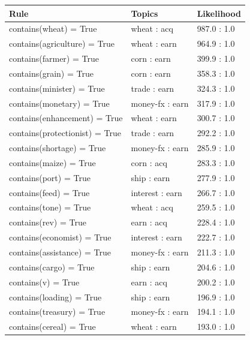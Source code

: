 \documentclass{article}
\begin{document}
\begin{table}
\begin{tabular}{l|l|l}
\textbf{Rule} & \textbf{Topics} & \textbf{Likelihood}\\ \hline
	contains(wheat) = True &            wheat : acq &   987.0 : 1.0\\
   contains(agriculture) = True &            wheat : earn   & 964.9 : 1.0\\
        contains(farmer) = True   &           corn : earn   &    399.9 : 1.0\\
         contains(grain) = True     &         corn : earn   &    358.3 : 1.0\\
      contains(minister) = True       &      trade : earn   & 324.3 : 1.0\\
      contains(monetary) = True         &   money-fx : earn   &    317.9 : 1.0\\
   contains(enhancement) = True           &  wheat : earn   &    300.7 : 1.0\\
 contains(protectionist) = True             & trade : earn   & 292.2 : 1.0\\
      contains(shortage) = True &           money-fx : earn   &    285.9 : 1.0\\
         contains(maize) = True   &           corn : acq    & 283.3 : 1.0\\
          contains(port) = True     &         ship : earn   &    277.9 : 1.0\\
          contains(feed) = True       &     interest : earn   &    266.7 : 1.0\\
          contains(tone) = True         &    wheat : acq    &    259.5 : 1.0\\
           contains(rev) = True           &   earn : acq    &    228.4 : 1.0\\
     contains(economist) = True &           interest : earn   &    222.7 : 1.0\\
    contains(assistance) = True   &         money-fx : earn   & 211.3 : 1.0\\
         contains(cargo) = True     &         ship : earn   &    204.6 : 1.0\\
             contains(v) = True       &       earn : acq    & 200.2 : 1.0\\
       contains(loading) = True         &     ship : earn   &    196.9 : 1.0\\
      contains(treasury) = True           & money-fx : earn   & 194.1 : 1.0\\
        contains(cereal) = True             & wheat : earn   &    193.0 : 1.0\\

\end{tabular}
\end{table}
\end{document}
